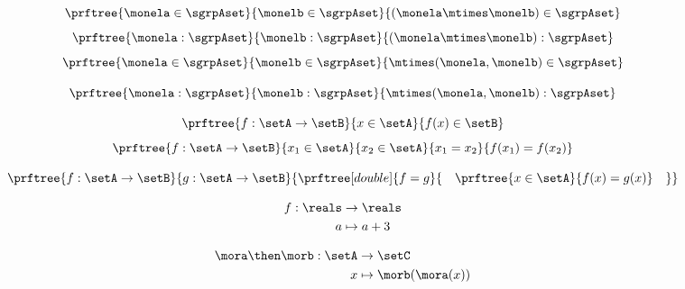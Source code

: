 \begin{forslides}
\begin{equation}\label{eq:moncomp1}
\prftree{\monela \in \sgrpAset}{\monelb \in \sgrpAset}{(\monela \mtimes \monelb) \in \sgrpAset}
\end{equation}
\begin{equation}\label{eq:moncomp2}
\prftree{\monela : \sgrpAset}{\monelb : \sgrpAset}{(\monela \mtimes \monelb) : \sgrpAset}
\end{equation}
\begin{equation}\label{eq:moncomp3}
\prftree{\monela \in \sgrpAset}{\monelb \in \sgrpAset}{\mtimes (\monela,\monelb) \in \sgrpAset}
\end{equation}

\begin{equation}\label{eq:moncomp4}
\prftree{\monela : \sgrpAset}{\monelb : \sgrpAset}{\mtimes (\monela ,\monelb) : \sgrpAset}
\end{equation}


\begin{equation}\label{eq:function-axiom1}
\prftree{f: \setA \to \setB}{x \in \setA}{f(x) \in \setB}
\end{equation}
\begin{equation}\label{eq:function-axiom2}
\prftree{f: \setA \to \setB}{x_1 \in \setA}{x_2 \in \setA}{x_1 = x_2}{f(x_1) = f(x_2) }
\end{equation}

\begin{equation}\label{eq:function-axiom3}
\prftree{f: \setA \to \setB}{g: \setA \to \setB }{
\prftree[double]{f = g}{
\quad
\prftree{x\in\setA}{
f(x) = g(x)}\quad
 }}
\end{equation}

\begin{equation}\label{eq:funcnotation1}
\begin{aligned}
f : \reals & \to  \reals \\
            a & \mapsto a + 3
     \end{aligned}
\end{equation}


\begin{equation}\label{eq:funcomposition}
\begin{aligned}
\mora \then \morb : \setA & \to  \setC \\
           x & \mapsto \morb(\mora(x))
     \end{aligned}
\end{equation}


\end{forslides}
